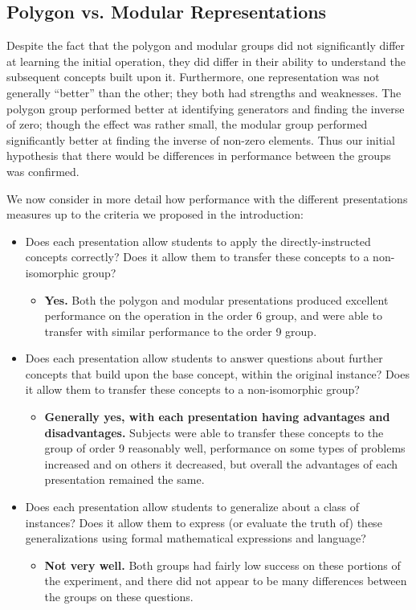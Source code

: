 \documentclass[man,mask,10pt]{apa6}
\begin{document}
\subsection{Polygon vs. Modular Representations}
Despite the fact that the polygon and modular groups did not significantly differ at learning the initial operation, they did differ in their ability to understand the subsequent concepts built upon it. Furthermore, one representation was not generally ``better'' than the other; they both had strengths and weaknesses. The polygon group performed better at identifying generators and finding the inverse of zero; though the effect was rather small, the modular group performed significantly better at finding the inverse of non-zero elements. Thus our initial hypothesis that there would be differences in performance between the groups was confirmed. \par 
We now consider in more detail how performance with the different presentations measures up to the criteria we proposed in the introduction:
\begin{itemize}
\item Does each presentation allow students to apply the directly-instructed concepts correctly? Does it allow them to transfer these concepts to a non-isomorphic group?
\begin{itemize}
\item[] \textbf{Yes.} Both the polygon and modular presentations produced excellent performance on the operation in the order 6 group, and were able to transfer with similar performance to the order 9 group.
\end{itemize}
\item Does each presentation allow students to answer questions about further concepts that build upon the base concept, within the original instance? Does it allow them to transfer these concepts to a non-isomorphic group?
\begin{itemize}
\item[] \textbf{Generally yes, with each presentation having advantages and disadvantages.} Subjects were able to transfer these concepts to the group of order 9 reasonably well, performance on some types of problems increased and on others it decreased, but overall the advantages of each presentation remained the same. 
\end{itemize}
\item Does each presentation allow students to generalize about a class of instances? Does it allow them to express (or evaluate the truth of) these generalizations using formal mathematical expressions and language? 
\begin{itemize}
\item[] \textbf{Not very well.} Both groups had fairly low success on these portions of the experiment, and there did not appear to be many differences between the groups on these questions.
\end{itemize}
\end{itemize}
\end{document}
